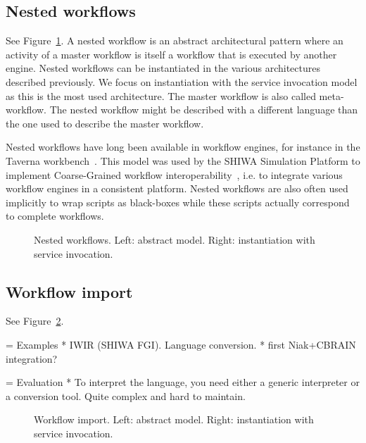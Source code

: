 \documentclass[preprint,3p,twocolumn]{elsarticle}
\begin{document}
\subsection{Nested workflows}

See Figure~\ref{archi:nested}. A nested workflow is an abstract
architectural pattern where an activity of a master workflow is itself
a workflow that is executed by another engine. Nested workflows can be
instantiated in the various architectures described previously. We
focus on instantiation with the service invocation model as this is
the most used architecture. The master workflow is also called
meta-workflow. The nested workflow might be described with a different
language than the one used to describe the master workflow.

Nested workflows have long been available in workflow engines, for
instance in the Taverna workbench~\cite{oinn2004taverna}. This model
was used by the SHIWA Simulation Platform to implement Coarse-Grained
workflow interoperability~\cite{terstyanszky2014enabling}, i.e. to
integrate various workflow engines in a consistent platform. Nested
workflows are also often used implicitly to wrap scripts as
black-boxes while these scripts actually correspond to complete workflows.

\begin{figure}
\centering
\def\svgwidth{0.48\columnwidth}

\def\svgwidth{0.48\columnwidth}

\caption{Nested workflows. Left: abstract model. Right: instantiation with service invocation.}
\label{archi:nested}
\end{figure}

\subsection{Workflow import}

See Figure~\ref{archi:import}.

= Examples
* IWIR (SHIWA FGI). Language conversion.
* first Niak+CBRAIN integration?

= Evaluation
* To interpret the language, you need either a generic interpreter or a conversion tool. Quite complex and hard to  maintain.

\begin{figure}
\centering
\def\svgwidth{0.48\columnwidth}

\def\svgwidth{0.48\columnwidth}

\caption{Workflow import. Left: abstract model. Right: instantiation with service invocation.}
\label{archi:import}
\end{figure}
\end{document}
